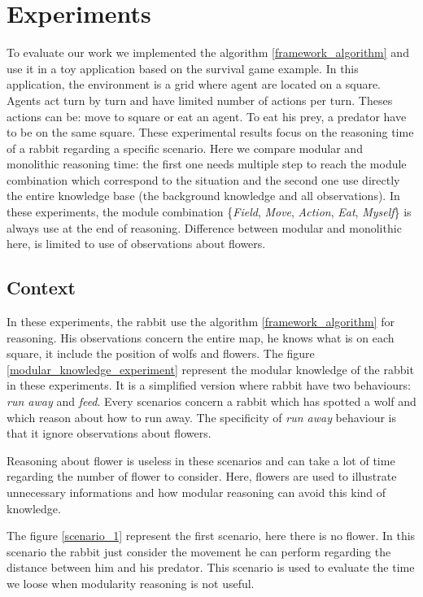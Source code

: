 \documentclass{aamas2012}
\begin{document}
\section{Experiments}

	To evaluate our work we implemented the algorithm \ref{framework_algorithm} and use it in a toy application based on the survival game example.
	In this application, the environment is a grid where agent are located on a square.
	Agents act turn by turn and have limited number of actions per turn.
	Theses actions can be: move to square or eat an agent.
	To eat his prey, a predator have to be on the same square.
	These experimental results focus on the reasoning time of a rabbit regarding a specific scenario.
	Here we compare modular and monolithic reasoning time: the first one needs multiple step to reach the module combination
	which correspond to the situation and the second one use directly the entire knowledge base (the background knowledge and all observations).
	In these experiments, the module combination \{\emph{Field}, \emph{Move}, \emph{Action}, \emph{Eat}, \emph{Myself}\} is always use at the end of reasoning.
	Difference between modular and monolithic here, is limited to use of observations about flowers.
	
\subsection{Context}
	
	In these experiments, the rabbit use the algorithm \ref{framework_algorithm} for reasoning.
	His observations concern the entire map, he knows what is on each square, it include the position of wolfs and flowers.
	The figure \ref{modular_knowledge_experiment} represent the modular knowledge of the rabbit in these experiments.
	It is a simplified version where rabbit have two behaviours: \textit{run away} and \textit{feed}.
	Every scenarios concern a rabbit which has spotted a wolf and which reason about how to run away.
	The specificity of \textit{run away} behaviour is that it ignore observations about flowers. 
	
	Reasoning about flower is useless in these scenarios and can take a lot of time regarding the number of flower to consider.
	Here, flowers are used to illustrate unnecessary informations and how modular reasoning can avoid this kind of knowledge.
	
	The figure \ref{scenario_1} represent the first scenario, here there is no flower.
	In this scenario the rabbit just consider the movement he can perform regarding the distance between him and his predator.
	This scenario is used to evaluate the time we loose when modularity reasoning is not useful.
	
\end{document}
